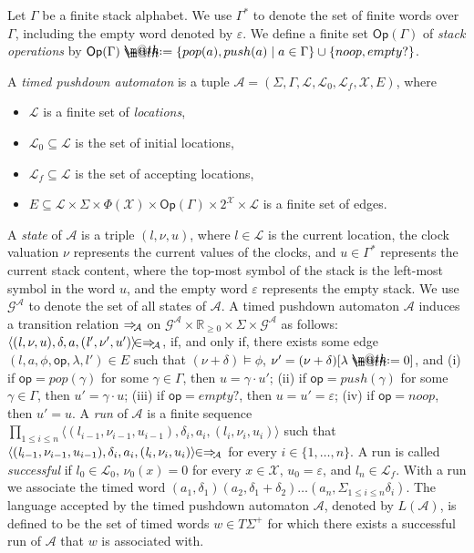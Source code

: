 \documentclass{CSML}
\makeatletter
\theoremstyle{plain}\newtheorem{theorem}[thm]{Theorem}
\theoremstyle{plain}\newtheorem{corollary}[thm]{Corollary}
\theoremstyle{plain}\newtheorem{example}[thm]{Example}
\theoremstyle{plain}\newtheorem{lemma}[thm]{Lemma}
\theoremstyle{plain}\newtheorem{remark}[thm]{Remark}
\newcommand{\RP}{\mathbb{R}_{\geq 0}}
\newcommand{\locs}{\mathcal{L}}
\newcommand{\edges}{E}
\newcommand{\clocks}{\mathcal{X}}
\newcommand{\loc}{\mathit{l}}
\newcommand{\TW}{T\Sigma^+}
\newcommand{\A}{\mathcal{A}}
\newcommand{\Op}{\mathsf{Op}}
\newcommand{\op}{\mathsf{op}}
\newcommand{\gs}{\mathcal{G}} \newcommand{\hs}{\mathcal{H}}
\newcommand*{\defeq}{\mathrel{\rlap{\raisebox{0.3ex}{$\m@th\cdot$}}\raisebox{-0.3ex}{$\m@th\cdot$}}=}
\newcommand{\transA}{\Rightarrow_{\hspace{-.8mm}\A}}
\makeatother
\begin{document}
Let $\Gamma$ be 
a finite stack alphabet. We use $\Gamma^*$ to denote the set of finite words over $\Gamma$, including the empty word denoted by $\varepsilon$. 
We define a finite set $\Op(\Gamma)$ of \emph{stack operations} by $\Op(\Gamma)\defeq\{pop(a),push(a)\mid a\in\Gamma\}\cup\{noop,empty?\}$. 




A \emph{timed pushdown automaton} is a tuple
$\A=(\Sigma, \Gamma, \locs, \locs_0, \locs_f, \clocks, \edges)$, where
\begin{itemize}
\item $\locs$ is a finite set of \emph{locations},
\item $\locs_0\subseteq\locs$ is the set of initial locations,
\item $\locs_f\subseteq \locs$ is the set of accepting locations,
\item $\edges \subseteq \locs\times\Sigma\times\Phi(\clocks)\times\Op(\Gamma) \times 2^\clocks\times\locs$ is a finite set of edges. 
\end{itemize}	
A \emph{state} of $\A$ is a triple $(\loc,\nu,u)$, where $\loc\in\locs$ is the current location, the clock valuation $\nu$ represents the current values of the clocks, and $u\in\Gamma^*$ represents the current stack content, where the top-most symbol of the stack is the left-most 
symbol in the word $u$, and the empty word $\varepsilon$ represents the empty stack. 
We use $\gs^\A$ to denote the set of all states of $\A$.
A timed pushdown automaton $\A$ induces a  transition relation $\transA$ on $\gs^\A\times\RP\times\Sigma\times\gs^\A$ as follows:
$\langle (\loc,\nu,u),\delta,a,(\loc',\nu',u')\rangle\hspace{-1.6mm}\in\transA$, if, and only if, there exists some edge $(\loc,a,\phi,\op,\lambda,\loc')\in\edges$ 
such that 
$(\nu+\delta)\models\phi$,
$\nu'=(\nu+\delta)[\lambda\defeq 0]$, 
and
(i) if $\op=pop(\gamma)$ for some $\gamma\in\Gamma$, 
then $u=\gamma\cdot u'$;
(ii) if $\op=push(\gamma)$ for some $\gamma\in\Gamma$,
then  $u'=\gamma\cdot u$;
(iii) if $\op=empty?$, then $u=u'=\varepsilon$;
(iv) if $\op=noop$, then $u'=u$. 
A \emph{run} of $\A$ is a finite sequence 
$\prod_{1\leq i\leq n} \langle (\loc_{i-1},\nu_{i-1},u_{i-1}),\delta_i,a_i,(\loc_i,\nu_i,u_i)\rangle$ such that
$\langle(\loc_{i-1},\nu_{i-1},u_{i-1}),\delta_i,a_i,(\loc_i,\nu_i,u_i)\rangle\hspace{-1.2mm}\in\transA$ 
for every $i\in\{1,\dots,n\}$. 
A run is called \emph{successful} if $\loc_0\in\locs_0$, $\nu_0(x)=0$ for every $x\in\clocks$, $u_0=\varepsilon$, and $\loc_n\in\locs_f$.
With a run we associate the timed word $(a_1,\delta_1)(a_2,\delta_1+\delta_2)\dots(a_n,\Sigma_{1\leq i\leq n}\delta_i)$. 
The language accepted by the timed pushdown automaton $\A$, denoted by $L(\A)$, is defined to be the set of timed words $w\in\TW$ for which there exists a successful run of $\A$ that $w$ is associated with.
\end{document}
